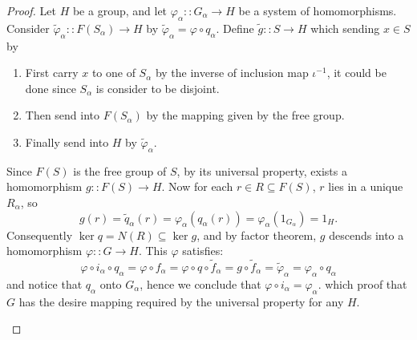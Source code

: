 \documentclass[a4paper,titlepage]{article}
\theoremstyle{remark}
\theoremstyle{definition}
\theoremstyle{theorem}
\begin{document}
\begin{proof}
    Let $H$ be a group, and let $\varphi_\alpha :: G_\alpha \to H$ be a system of homomorphisms.
    Consider $\tilde{\varphi}_\alpha :: F(S_\alpha) \to H$ by $\tilde{\varphi}_\alpha = \varphi \circ q_\alpha$.
    Define $\tilde{g} :: S \to H$ which sending $x \in S$ by
    \begin{enumerate}
      \item First carry $x$ to one of $S_\alpha$ by the inverse of inclusion map $\iota^{-1}$, 
        it could be done since $S_\alpha$ is consider to be disjoint.
      \item Then send into $F(S_\alpha)$ by the mapping given by the free group.
      \item Finally send into $H$ by $\tilde{\varphi}_\alpha$.
    \end{enumerate}
    Since $F(S)$ is the free group of $S$, by its universal property, exists a homomorphism $g :: F(S) \to H$.
    Now for each $r \in R \subseteq F(S)$, $r$ lies in a unique $R_\alpha$, so
    \[ g(r) = \tilde{q}_\alpha(r) = \varphi_\alpha(q_\alpha(r)) = \varphi_\alpha(1_{G_\alpha}) = 1_H. \]
    Consequently $\ker q = N(R) \subseteq \ker g$, and by factor theorem, $g$ descends into a
    homomorphism $\varphi :: G \to H$. This $\varphi$ satisfies:
    \[
      \varphi \circ i_\alpha \circ q_\alpha = \varphi \circ f_\alpha
      = \varphi \circ q \circ \tilde{f}_\alpha
      = g \circ \tilde{f}_\alpha
      = \tilde{\varphi}_\alpha
      = \varphi_\alpha \circ q_\alpha
    \]
    and notice that $q_\alpha$ onto $G_\alpha$, hence we conclude that $\varphi \circ i_\alpha = \varphi_\alpha$.
    which proof that $G$ has the desire mapping required by the universal property for any $H$.
    \begin{figure}[h]
      \centering
\end{figure}
\end{proof}
\end{document}
